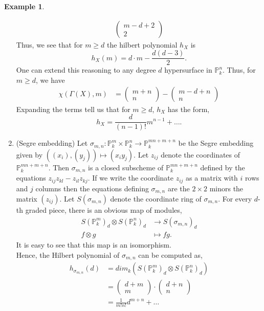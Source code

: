 \documentclass[11pt]{amsart}
\renewcommand{\P}{{\mathbb P}}
\theoremstyle{definition}
\newtheorem{example}[theorem]{Example}
\begin{document}
\begin{example}
\begin{enumerate}
\begin{align*}
\begin{pmatrix}
		m - d + 2 \\
		2
		\end{pmatrix}
		\end{align*}
		Thus, we see that for $m\geq d$ the hilbert polynomial $h_X$ is
		\[h_X(m) = d\cdot m - \frac{d(d-3)}{2}.\]
		One can extend this reasoning to any degree $d$ hypersurface in $\P_k^n$. Thus, for $m\geq d$, we have
		\begin{align*}
		\chi(\Gamma(X),m) & = \begin{pmatrix}
		m + n \\
		n
		\end{pmatrix}
		- \begin{pmatrix}
		m - d + n \\
		n
		\end{pmatrix}
		\end{align*}
		Expanding the terms tell us that for $m\geq d$, $h_X$ has the form,
		\[h_X = \frac{d}{(n-1)!}m^{n-1}+\ldots .\]
		\item (Segre embedding) Let $\sigma_{m,n} : \P_k^m \times \P_k^n \rightarrow \P_k^{mn+m+n}$ be the Segre embedding given by $((x_i),(y_j))\mapsto (x_iy_j)$. Let $z_{ij}$ denote the coordinates of $\P_k^{mn+m+n}$. Then $\sigma_{m,n}$ is a closed subscheme of $\P_k^{mn+m+n}$ defined by the equations $z_{ij}z_{kl}-z_{il}z_{kj}$. If we write the coordinate $z_{ij}$ as a matrix with $i$ rows and $j$ columns then the equations defining $\sigma_{m,n}$ are the $2\times 2$ minors the matrix $(z_{ij})$. Let $S(\sigma_{m,n})$ denote the coordinate ring of $\sigma_{m,n}$. For every $d$-th graded piece, there is an obvious map of modules,
		\begin{align*}
		S(\P_k^m)_d \otimes S(\P_k^n)_d &\rightarrow S(\sigma_{m,n})_d\\
		f \otimes g &\mapsto fg.
		\end{align*}
		It is easy to see that this map is an isomorphism.\\
		Hence, the Hilbert polynomial of $\sigma_{m,n}$ can be computed as,
		\begin{align*}
		h_{\sigma_{m,n}}(d) &= dim_k (S(\P_k^m)_d \otimes S(\P_k^n)_d)\\
		&= \begin{pmatrix}
		d + m \\
		m
		\end{pmatrix}
		\cdot \begin{pmatrix}
		d + n \\
		n
		\end{pmatrix}\\
		&= \frac{1}{m!n!}d^{m+n}+\ldots
		\end{align*}
		\end{enumerate}
	
\end{example}
\end{document}
